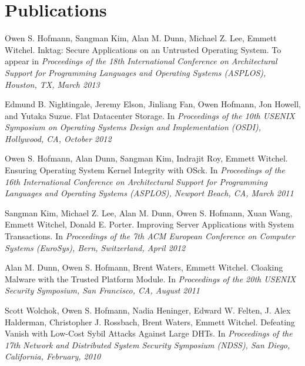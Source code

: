 \section{Publications}
\begin{bibsectionfirst}

\item Owen S. Hofmann, Sangman Kim, Alan M. Dunn, Michael Z. Lee, Emmett
Witchel.
Inktag: Secure Applications on an Untrusted Operating System.
To appear in \emph {Proceedings of the 18th International Conference on
Architectural Support for Programming Languages and Operating Systems
(ASPLOS), Houston, TX, March 2013}

\end{bibsectionfirst}
\begin{bibsection}

\item Edmund B. Nightingale, Jeremy Elson, Jinliang Fan, Owen Hofmann, Jon
Howell, and Yutaka Suzue.
Flat Datacenter Storage. 
In \emph{Proceedings of the 10th USENIX Symposium on Operating Systems
Design and Implementation (OSDI), Hollywood, CA, October 2012}

\item Owen S. Hofmann, Alan Dunn, Sangman Kim, Indrajit Roy, Emmett Witchel.
Ensuring Operating System Kernel Integrity with OSck.
In \emph{Proceedings of the 16th International Conference on Architectural
Support for Programming Languages and Operating Systems (ASPLOS), Newport
Beach, CA, March 2011} 

\item Sangman Kim, Michael Z. Lee, Alan M. Dunn, Owen S. Hofmann, Xuan
Wang, Emmett Witchel, Donald E. Porter.
Improving Server Applications with System Transactions.
In \emph{Proceedings of the 7th ACM European Conference on Computer Systems
(EuroSys), Bern, Switzerland, April 2012}

\item Alan M. Dunn, Owen S. Hofmann, Brent Waters, Emmett Witchel.
Cloaking Malware with the Trusted Platform Module.
In \emph{Proceedings of the 20th USENIX Security Symposium, San Francisco,
CA, August 2011}

\item Scott Wolchok, Owen S. Hofmann,  Nadia Heninger,  Edward W. Felten,
J. Alex Halderman, Christopher J. Rossbach, Brent Waters, Emmett Witchel.
Defeating Vanish with Low-Cost Sybil Attacks Against Large DHTs.
 In \emph{Proceedings of the 17th Network and Distributed System Security
Symposium (NDSS), San Diego, California, February, 2010}



\end{bibsection}
